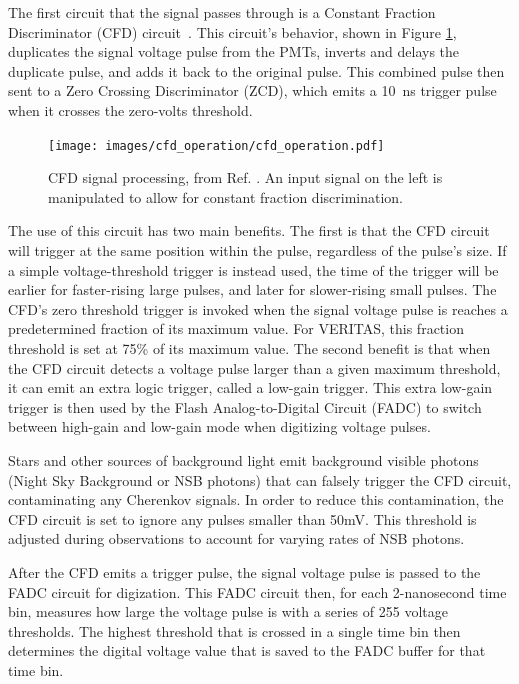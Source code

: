 The first circuit that the signal passes through is a Constant Fraction Discriminator (CFD) circuit~\cite{cfd_behavior}.
This circuit's behavior, shown in Figure \ref{fig:cfd_operation}, duplicates the signal voltage pulse from the PMTs, inverts and delays the duplicate pulse, and adds it back to the original pulse.
This combined pulse then sent to a Zero Crossing Discriminator (ZCD), which emits a \SI{10}{ns} trigger pulse when it crosses the zero-volts threshold.

\begin{figure}[ht]
  \centering
  \texttt{[image: images/cfd\_operation/cfd\_operation.pdf]}
  \caption[CFD Operation]{
    CFD signal processing, from Ref. \cite{cfd_operation}.
    An input signal on the left is manipulated to allow for constant fraction discrimination.
  }
  \label{fig:cfd_operation}
\end{figure}

The use of this circuit has two main benefits.
The first is that the CFD circuit will trigger at the same position within the pulse, regardless of the pulse's size.
If a simple voltage-threshold trigger is instead used, the time of the trigger will be earlier for faster-rising large pulses, and later for slower-rising small pulses.
The CFD's zero threshold trigger is invoked when the signal voltage pulse is reaches a predetermined fraction of its maximum value.
For VERITAS, this fraction threshold is set at 75\% of its maximum value.
The second benefit is that when the CFD circuit detects a voltage pulse larger than a given maximum threshold, it can emit an extra logic trigger, called a low-gain trigger.
This extra low-gain trigger is then used by the Flash Analog-to-Digital Circuit (FADC) to switch between high-gain and low-gain mode when digitizing voltage pulses.

Stars and other sources of background light emit background visible photons (Night Sky Background or NSB photons) that can falsely trigger the CFD circuit, contaminating any Cherenkov signals.
In order to reduce this contamination, the CFD circuit is set to ignore any pulses smaller than 50mV.
This threshold is adjusted during observations to account for varying rates of NSB photons.

After the CFD emits a trigger pulse, the signal voltage pulse is passed to the FADC circuit for digization.
This FADC circuit then, for each 2-nanosecond time bin, measures how large the voltage pulse is with a series of 255 voltage thresholds.
The highest threshold that is crossed in a single time bin then determines the digital voltage value that is saved to the FADC buffer for that time bin.

